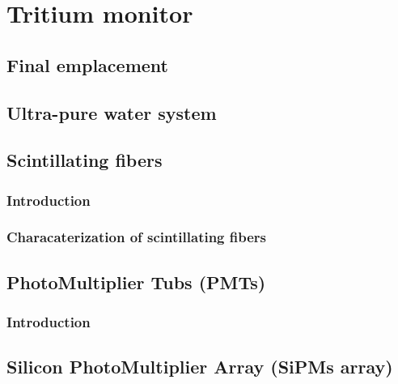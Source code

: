 \documentclass[12pt,a4paper]{book}
\begin{document}
\chapter{Tritium monitor}  \label{chap:Tritium_monitor}


	\section{Final emplacement}
	\newpage
	
	\section{Ultra-pure water system}
	\newpage
	
	\section{Scintillating fibers}
		\subsection{Introduction}
		\newpage
		
		\subsection{Characaterization of scintillating fibers}
		\newpage
		
	\section{PhotoMultiplier Tubs (PMTs)}
		\subsection{Introduction}
		\newpage
		
	\section{Silicon PhotoMultiplier Array (SiPMs array)}
\end{document}
